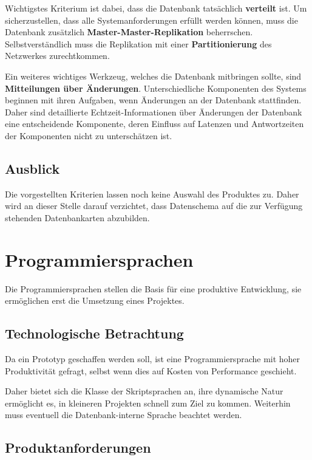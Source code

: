 Wichtigstes Kriterium ist dabei, dass die Datenbank tats\"achlich \textbf{verteilt} ist.
Um sicherzustellen, dass alle Systemanforderungen erf\"ullt werden k\"onnen,
muss die Datenbank zus\"atzlich \textbf{Master-Master-Replikation} beherrschen.
Selbstverst\"andlich muss die Replikation mit einer \textbf{Partitionierung} des Netzwerkes zurechtkommen.

Ein weiteres wichtiges Werkzeug, welches die Datenbank mitbringen sollte, sind \textbf{Mitteilungen über Änderungen}.
Unterschiedliche Komponenten des Systems beginnen mit ihren Aufgaben,
wenn Änderungen an der Datenbank stattfinden.
Daher sind detaillierte Echtzeit-Informationen über Änderungen der Datenbank eine entscheidende Komponente,
deren Einfluss auf Latenzen und Antwortzeiten der Komponenten nicht zu unterschätzen ist.

\subsection{Ausblick}

Die vorgestellten Kriterien lassen noch keine Auswahl des Produktes zu.
Daher wird an dieser Stelle darauf verzichtet, dass Datenschema auf die zur Verfügung stehenden Datenbankarten abzubilden.

\section{Programmiersprachen}
\label{sec:tech:proglang}

Die Programmiersprachen stellen die Basis f\"ur eine produktive Entwicklung,
sie erm\"oglichen erst die Umsetzung eines Projektes.

\subsection{Technologische Betrachtung}

Da ein Prototyp geschaffen werden soll,
ist eine Programmiersprache mit hoher Produktivit\"at gefragt,
selbst wenn dies auf Kosten von Performance geschieht.

Daher bietet sich die Klasse der Skriptsprachen an,
ihre dynamische Natur ermöglicht es,
in kleineren Projekten schnell zum Ziel zu kommen.
Weiterhin muss eventuell die Datenbank-interne Sprache beachtet werden.


\subsection{Produktanforderungen}

